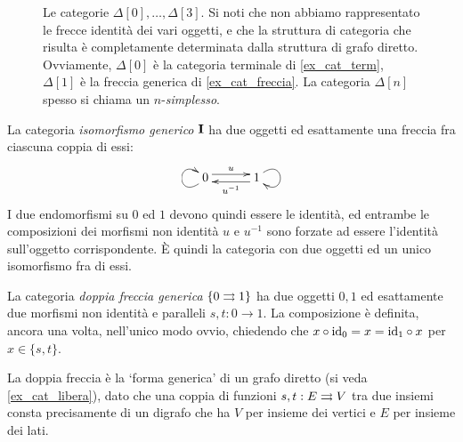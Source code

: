 \begin{example}
\begin{figure}[h]
\begin{center}
		\end{center}
		\caption{Le categorie \(\Delta[0], \dots,\Delta[3]\). Si noti che non abbiamo rappresentato le frecce identità dei vari oggetti, e che la struttura di categoria che risulta è completamente determinata dalla struttura di grafo diretto. Ovviamente, \(\Delta[0]\) è la categoria terminale di \ref{ex_cat_term}, \(\Delta[1]\) è la freccia generica di \ref{ex_cat_freccia}. La categoria \(\Delta[n]\) spesso si chiama un \(n\)-\emph{simplesso}. }
		\label{fig:le_delta}
	\end{figure}
\end{example}
\begin{example}\label{ex_cat_iso}
	La categoria \emph{isomorfismo generico} \(\mathbf{I}\) ha due oggetti ed esattamente una freccia fra ciascuna coppia di essi:
	\[\xymatrix@C=7ex{0 \ar@<.7ex>[r]^u \ar@(dl,ul)[] & 1 \ar@<.7ex>[l]^{u^{-1}} \ar@(ur,dr)[]}\]
	I due endomorfismi su \(0\) ed \(1\) devono quindi essere le identità, ed entrambe le composizioni dei morfismi non identità \(u\) e \(u^{-1}\) sono forzate ad essere l'identità sull'oggetto corrispondente. \`E quindi la categoria con due oggetti ed un unico isomorfismo fra di essi.
\end{example}
\begin{example}\label{ex_cat_doppiafreccia}
	La categoria \emph{doppia freccia generica} \(\{0\rightrightarrows 1\}\) ha due oggetti \(0,1\) ed esattamente due morfismi non identità e paralleli \(s,t : 0\to 1\). La composizione è definita, ancora una volta, nell'unico modo ovvio, chiedendo che \(x\circ \mathrm{id}_0=x=\mathrm{id}_1\circ x\) per \(x\in\{s,t\}\).

	La doppia freccia è la `forma generica' di un grafo diretto (si veda \ref{ex_cat_libera}), dato che una coppia di funzioni \(s,t: E \rightrightarrows V\) tra due insiemi consta precisamente di un digrafo che ha \(V\) per insieme dei vertici e \(E\) per insieme dei lati.
\end{example}
